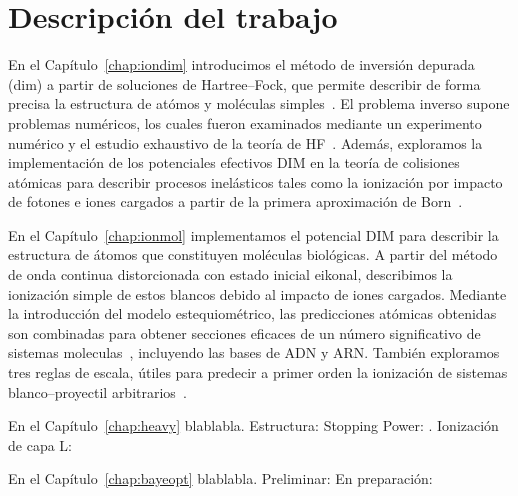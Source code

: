 
\section{Descripción del trabajo}

En el Capítulo~\ref{chap:iondim} introducimos el método de inversión 
depurada (\acs{dim}) a partir de soluciones de Hartree--Fock, que 
permite describir de forma precisa la estructura de atómos y moléculas 
simples~\cite{Mendez:16,Mendez:19dim}. El problema inverso supone 
problemas numéricos, los cuales fueron examinados mediante un 
experimento numérico y el estudio exhaustivo de la teoría de 
HF~\cite{Mendez:18,Mitnik:19}. Además, exploramos la implementación de 
los potenciales efectivos DIM en la teoría de colisiones atómicas para 
describir procesos inelásticos tales como la ionización por impacto de 
fotones e iones cargados a partir de la primera aproximación de 
Born~\cite{Mendez:19dim}. 

En el Capítulo~\ref{chap:ionmol} implementamos el potencial DIM para 
describir la estructura de átomos que constituyen moléculas biológicas.
A partir del método de onda continua distorcionada con estado inicial 
eikonal, describimos la ionización simple de estos blancos debido al 
impacto de iones cargados. Mediante la introducción del modelo  
estequiométrico, las predicciones atómicas obtenidas son combinadas para  
obtener secciones eficaces de un número significativo de sistemas 
moleculas~\cite{Mendez:20ionmol}, incluyendo las bases de ADN y 
ARN. También exploramos tres reglas de escala, útiles para predecir a 
primer orden la ionización de sistemas blanco--proyectil 
arbitrarios~\cite{Mendez:20scale}. 

En el Capítulo~\ref{chap:heavy} blablabla. 
Estructura: \cite{Mendez:19relat} 
Stopping Power: \cite{Montanari:20}.
Ionización de capa L: \cite{Oswald:20}

En el Capítulo~\ref{chap:bayeopt} blablabla.
Preliminar: \cite{Mendez:20baye}
En preparación: \cite{Mendez:prep}

